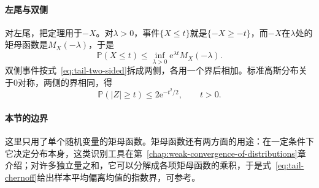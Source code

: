 \paragraph{左尾与双侧}
对左尾，把定理用于$-X$。对$\lambda>0$，事件$\{X\leq t\}$就是$\{-X\geq-t\}$，而$-X$在$\lambda$处的矩母函数是$M_X(-\lambda)$，于是
\begin{equation}
 \mathbb{P}(X\leq t)\leq\inf_{\lambda>0}\mathrm{e}^{\lambda t}M_X(-\lambda) .
 \label{eq:tail-chernoff-left}
\end{equation}
双侧事件按式~\eqref{eq:tail-two-sided}拆成两侧，各用一个界后相加。标准高斯分布关于$0$对称，两侧的界相同，得
\[
 \mathbb{P}(\lvert Z\rvert\geq t)\leq2\mathrm{e}^{-t^2/2},\qquad t>0 .
\]

\paragraph{本节的边界}
这里只用了单个随机变量的矩母函数。矩母函数还有两方面的用途：在一定条件下它决定分布本身，这类识别工具在第~\ref{chap:weak-convergence-of-distributions}章介绍；对许多独立量之和，它可以分解成各项矩母函数的乘积，于是式~\eqref{eq:tail-chernoff}给出样本平均偏离均值的指数界，可参考。
